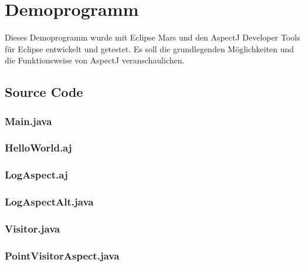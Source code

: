 \chapter{Demoprogramm}
\label{chap:demoprogramm}
Dieses Demoprogramm wurde mit Eclipse Mars und den AspectJ Developer Tools für Eclipse entwickelt und getestet. Es soll die grundlegenden Möglichkeiten und die Funktionsweise von AspectJ veranschaulichen.

\section{Source Code}
\label{demo_source}

\subsection{Main.java}


\subsection{HelloWorld.aj}


\subsection{LogAspect.aj}


\subsection{LogAspectAlt.java}


\subsection{Visitor.java}


\subsection{PointVisitorAspect.java}


